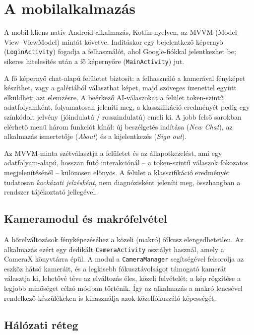 \section{A mobilalkalmazás}

A mobil kliens natív Android alkalmazás, Kotlin nyelven, az MVVM (Model--View--ViewModel)
mintát követve. Indításkor egy bejelentkező képernyő (\texttt{LoginActivity})
fogadja a felhasználót, ahol Google-fiókkal jelentkezhet be; sikeres hitelesítés
után a fő képernyőre (\texttt{MainActivity}) jut.

A fő képernyő chat-alapú felületet biztosít: a felhasználó a kamerával
fényképet készíthet, vagy a galériából választhat képet, majd szöveges üzenettel
együtt elküldheti azt elemzésre. A beérkező AI-válaszokat a felület token-szintű
adatfolyamként, folyamatosan jeleníti meg, a klasszifikáció eredményét pedig egy
színkódolt jelvény (jó\-indulatú / rosszindulatú) emeli ki. A jobb felső sarokban
elérhető menü három funkciót kínál: új beszélgetés indítása (\textit{New Chat}),
az alkalmazás ismertetője (\textit{About}) és a kijelentkezés (\textit{Sign out}).

Az MVVM-minta szétválasztja a felületet és az állapotkezelést, ami egy
adatfolyam-alapú, hosszan futó interakciónál -- a token-szintű válaszok
fokozatos megjelenítésénél -- különösen előnyös. A felület a klasszifikáció
eredményét tudatosan \emph{kockázati jelzésként}, nem diagnózisként jeleníti
meg, összhangban a rendszer tájékoztató jellegével.

\subsection{Kameramodul és makrófelvétel}

A bőrelváltozások fényképezéséhez a közeli (makró) fókusz elengedhetetlen. Az
alkalmazás ezért egy dedikált \texttt{CameraActivity} osztályt használ, amely a
CameraX könyvtárra épül. A modul a \texttt{CameraManager} segítségével
felsorolja az eszköz hátsó kameráit, és a legkisebb fókusztávolságot támogató
kamerát választja ki, lehetővé téve az elváltozás éles, közeli felvételét; a kép
rögzítése a legjobb minőséget célzó módban történik. Így az alkalmazás a makró
lencsével rendelkező készülékeken is kihasználja azok közelfókuszáló képességét.

\subsection{Hálózati réteg}

